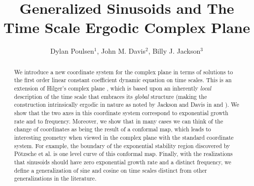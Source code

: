 \documentclass[reqno]{amsart}
\theoremstyle{plain}
\theoremstyle{definition}
\numberwithin{theorem}{section}
\numberwithin{definition}{section}
\numberwithin{prop}{section}
\numberwithin{example}{section}
\begin{document}


\title{Generalized Sinusoids and The Time Scale Ergodic Complex Plane}
\author[Poulsen, Davis, Jackson]{Dylan Poulsen$^1$, John M. Davis$^2$, Billy J. Jackson$^3$}
\address{$^1$Department of Mathematics, Washington College, Chestertown, MD 21620-5129}
\address{$^2$Department of Mathematics, Baylor University, Waco, TX 76798}
\address{$^3$Department of Mathematics, Statistics, and Computer Science, University of Illinois Chicago, Chicago, IL 60607}

\begin{abstract}
We introduce a new coordinate system for the complex plane in terms of solutions to the first order linear constant coefficient dynamic equation on time scales. This is an extension of Hilger's complex plane \cite{HiA}, which is based upon an inherently \emph{local} description of the time scale that embraces its \emph{global} structure (making the construction intrinsically ergodic in nature as noted by Jackson and Davis in \cite{JaDaE} and \cite{JaDalap}). We show that the two axes in this coordinate system correspond to exponential growth rate and to frequency. Moreover, we show that in many cases we can think of the change of coordinates as being the result of a conformal map, which leads to interesting geometry when viewed in the complex plane with the standard coordinate system. For example, the boundary of the exponential stability region discovered by Pötzsche et al. \cite{PoSiWi} is one level curve of this conformal map. Finally, with the realizations that sinusoids should have zero exponential growth rate and a distinct frequency, we define a generalization of sine and cosine on time scales distinct from other generalizations in the literature. 
\end{abstract}

\maketitle

\end{document}
